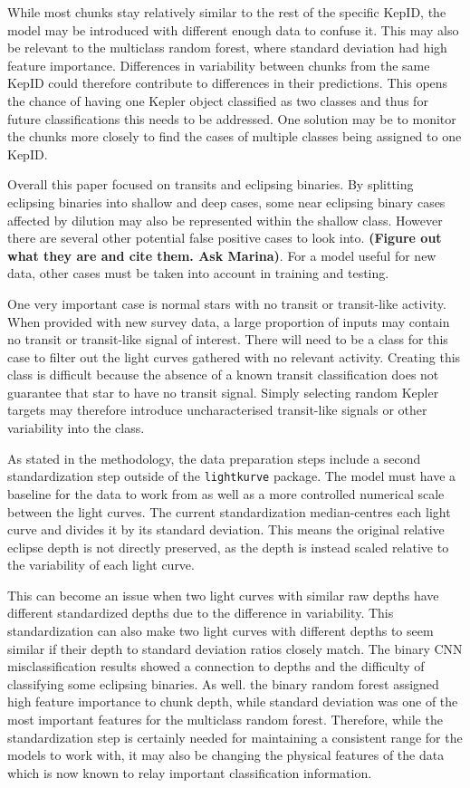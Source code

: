 While most chunks stay relatively similar to the rest of the specific KepID, the model may be introduced with different enough data to confuse it. This may also be relevant to the multiclass random forest, where standard deviation had high feature importance. Differences in variability between chunks from the same KepID could therefore contribute to differences in their predictions. This opens the chance of having one Kepler object classified as two classes and thus for future classifications this needs to be addressed. One solution may be to monitor the chunks more closely to find the cases of multiple classes being assigned to one KepID.

Overall this paper focused on transits and eclipsing binaries. By splitting eclipsing binaries into shallow and deep cases, some near eclipsing binary cases affected by dilution may also be represented within the shallow class. However there are several other potential false positive cases to look into. \textbf{(Figure out what they are and cite them. Ask Marina)}. For a model useful for new data, other cases must be taken into account in training and testing. 

One very important case is normal stars with no transit or transit-like activity. When provided with new survey data, a large proportion of inputs may contain no transit or transit-like signal of interest. There will need to be a class for this case to filter out the light curves gathered with no relevant activity. Creating this class is difficult because the absence of a known transit classification does not guarantee that star to have no transit signal. Simply selecting random Kepler targets may therefore introduce uncharacterised transit-like signals or other variability into the class. 

As stated in the methodology, the data preparation steps include a second standardization step outside of the \texttt{lightkurve} package. The model must have a baseline for the data to work from as well as a more controlled numerical scale between the light curves. The current standardization median-centres each light curve and divides it by its standard deviation. This means the original relative eclipse depth is not directly preserved, as the depth is instead scaled relative to the variability of each light curve. 

This can become an issue when two light curves with similar raw depths have different standardized depths due to the difference in variability. This standardization can also make two light curves with different depths to seem similar if their depth to standard deviation ratios closely match. The binary CNN misclassification results showed a connection to depths and the difficulty of classifying some eclipsing binaries. As well. the binary random forest assigned high feature importance to chunk depth, while standard deviation was one of the most important features for the multiclass random forest. Therefore, while the standardization step is certainly needed for maintaining a consistent range for the models to work with, it may also be changing the physical features of the data which is now known to relay important classification information.

